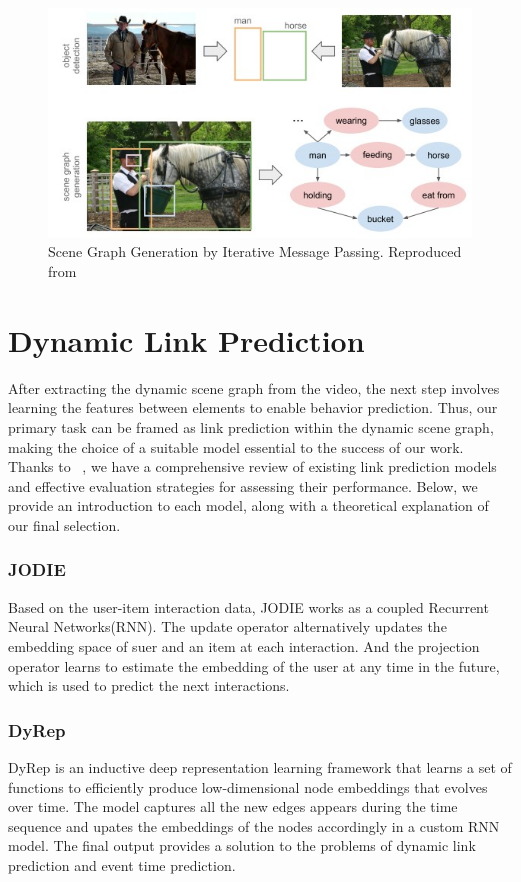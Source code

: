 \begin{figure}
    \centering
    \includegraphics[width=\linewidth]{figures/03_SGG.jpg}
    \caption{Scene Graph Generation by Iterative Message Passing. Reproduced from\cite{tang2020unbiased}}
    \label{fig:SGG}
\end{figure}

\section{Dynamic Link Prediction}

After extracting the dynamic scene graph from the video, the next step involves learning the features between elements to enable behavior prediction. Thus, our primary task can be framed as link prediction within the dynamic scene graph, making the choice of a suitable model essential to the success of our work. Thanks to ~\cite{poursafaei2022towards}, we have a comprehensive review of existing link prediction models and effective evaluation strategies for assessing their performance. Below, we provide an introduction to each model, along with a theoretical explanation of our final selection.

\subsubsection{JODIE}
Based on the user-item interaction data, JODIE\cite{kumar2019predicting} works as a coupled Recurrent Neural Networks(RNN). The update operator alternatively updates the embedding space of suer and an item at each interaction. And the projection operator learns to estimate the embedding of the user at any time in the future, which is used to predict the next interactions. 

\subsubsection{DyRep}
DyRep\cite{trivedi2018representation} is an inductive deep representation learning framework that learns a set of functions to efficiently produce low-dimensional node embeddings that evolves over time. The model captures all the new edges appears during the time sequence and upates the embeddings of the nodes accordingly in a custom RNN model. The final output provides a solution to the problems of dynamic link prediction and event time prediction.

